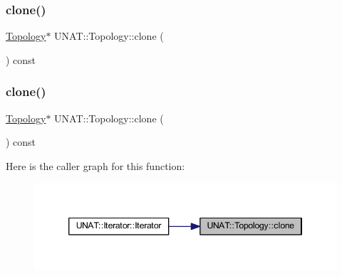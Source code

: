 \subsubsection{\texorpdfstring{clone()}{clone()}\hspace{0.1cm}{\footnotesize\ttfamily [2/3]}}
{\footnotesize\ttfamily \mbox{\hyperlink{classUNAT_1_1Topology}{Topology}}$\ast$ U\+N\+A\+T\+::\+Topology\+::clone (\begin{DoxyParamCaption}{ }\end{DoxyParamCaption}) const\hspace{0.3cm}{\ttfamily [inline]}}

\mbox{\label{classUNAT_1_1Topology_acb0a82ccbd9db10c8e9ddfc73017587a}} 
\subsubsection{\texorpdfstring{clone()}{clone()}\hspace{0.1cm}{\footnotesize\ttfamily [3/3]}}
{\footnotesize\ttfamily \mbox{\hyperlink{classUNAT_1_1Topology}{Topology}}$\ast$ U\+N\+A\+T\+::\+Topology\+::clone (\begin{DoxyParamCaption}{ }\end{DoxyParamCaption}) const\hspace{0.3cm}{\ttfamily [inline]}}

Here is the caller graph for this function\+:
\nopagebreak
\begin{figure}[H]
\begin{center}
\leavevmode
\includegraphics[width=346pt]{classUNAT_1_1Topology_acb0a82ccbd9db10c8e9ddfc73017587a_icgraph}
\end{center}
\end{figure}
\mbox{\label{classUNAT_1_1Topology_abe162cf4b45297f8f022db63c11140d1}} 
